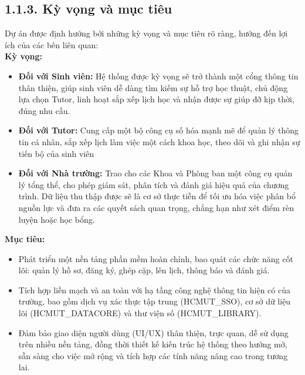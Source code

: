 \subsection*{1.1.3. Kỳ vọng và mục tiêu}
Dự án được định hướng bởi những kỳ vọng và mục tiêu rõ ràng, hướng đến lợi ích của các bên liên quan: \\
\textbf{Kỳ vọng:}
\begin{itemize}
    \item \textbf{Đối với Sinh viên:}  Hệ thống được kỳ vọng sẽ trở thành một cổng thông tin thân thiện, giúp sinh viên dễ dàng tìm kiếm sự hỗ trợ học thuật, chủ động lựa chọn Tutor, linh hoạt sắp xếp lịch học và nhận được sự giúp đỡ kịp thời, đúng nhu cầu.
    \item \textbf{Đối với Tutor:} Cung cấp một bộ công cụ số hóa mạnh mẽ để quản lý thông tin cá nhân, sắp xếp lịch làm việc một cách khoa học, theo dõi và ghi nhận sự tiến bộ của sinh viên
    \item \textbf{Đối với Nhà trường:} Trao cho các Khoa và Phòng ban một công cụ quản lý tổng thể, cho phép giám sát, phân tích và đánh giá hiệu quả của chương trình. Dữ liệu thu thập được sẽ là cơ sở thực tiễn để tối ưu hóa việc phân bổ nguồn lực và đưa ra các quyết sách quan trọng, chẳng hạn như xét điểm rèn luyện hoặc học bổng.
\end{itemize}
\textbf{Mục tiêu:}
\begin{itemize}
    \item Phát triển một nền tảng phần mềm hoàn chỉnh, bao quát các chức năng cốt lõi: quản lý hồ sơ, đăng ký, ghép cặp, lên lịch, thông báo và đánh giá.
    \item Tích hợp liền mạch và an toàn với hạ tầng công nghệ thông tin hiện có của trường, bao gồm dịch vụ xác thực tập trung (HCMUT\_SSO), cơ sở dữ liệu lõi (HCMUT\_DATACORE) và thư viện số (HCMUT\_LIBRARY).
    \item Đảm bảo giao diện người dùng (UI/UX) thân thiện, trực quan, dễ sử dụng trên nhiều nền tảng, đồng thời thiết kế kiến trúc hệ thống theo hướng mở, sẵn sàng cho việc mở rộng và tích hợp các tính năng nâng cao trong tương lai.
\end{itemize}


